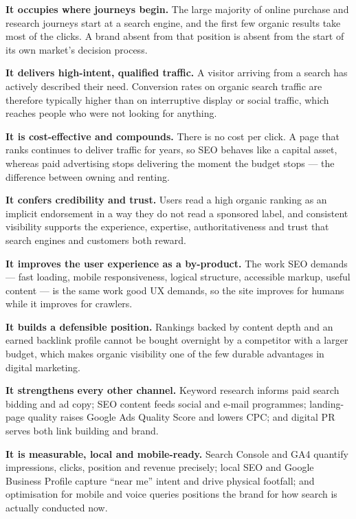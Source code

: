 \begin{qlist}
\begin{apts}
\item \textbf{It occupies where journeys begin.} The large majority of online
      purchase and research journeys start at a search engine, and the first
      few organic results take most of the clicks. A brand absent from that
      position is absent from the start of its own market's decision process.
\item \textbf{It delivers high-intent, qualified traffic.} A visitor arriving
      from a search has actively described their need. Conversion rates on
      organic search traffic are therefore typically higher than on
      interruptive display or social traffic, which reaches people who were not
      looking for anything.
\item \textbf{It is cost-effective and compounds.} There is no cost per click.
      A page that ranks continues to deliver traffic for years, so SEO behaves
      like a capital asset, whereas paid advertising stops delivering the
      moment the budget stops --- the difference between owning and renting.
\item \textbf{It confers credibility and trust.} Users read a high organic
      ranking as an implicit endorsement in a way they do not read a
      sponsored label, and consistent visibility supports the experience,
      expertise, authoritativeness and trust that search engines and customers
      both reward.
\item \textbf{It improves the user experience as a by-product.} The work SEO
      demands --- fast loading, mobile responsiveness, logical structure,
      accessible markup, useful content --- is the same work good UX demands,
      so the site improves for humans while it improves for crawlers.
\item \textbf{It builds a defensible position.} Rankings backed by content
      depth and an earned backlink profile cannot be bought overnight by a
      competitor with a larger budget, which makes organic visibility one of
      the few durable advantages in digital marketing.
\item \textbf{It strengthens every other channel.} Keyword research informs
      paid search bidding and ad copy; SEO content feeds social and e-mail
      programmes; landing-page quality raises Google Ads Quality Score and
      lowers CPC; and digital PR serves both link building and brand.
\item \textbf{It is measurable, local and mobile-ready.} Search Console and GA4
      quantify impressions, clicks, position and revenue precisely; local SEO
      and Google Business Profile capture ``near me'' intent and drive physical
      footfall; and optimisation for mobile and voice queries positions the
      brand for how search is actually conducted now.
\end{apts}


\end{qlist}
